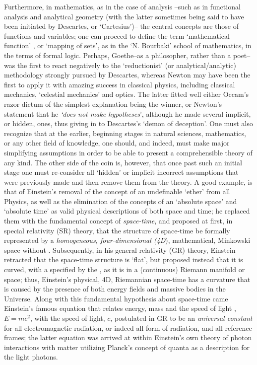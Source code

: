 \documentclass[12pt]{article}
\theoremstyle{plain}
\theoremstyle{definition}
\numberwithin{equation}{section}
\begin{document}
Furthermore, in mathematics, as in the case of analysis --such as in functional analysis and analytical geometry (with the latter sometimes being said to have been initiated by Descartes, or `Cartesius')-- the central concepts are those of functions and variables; one can proceed to define the term `mathematical function' , or `mapping of sets', as in the `N. Bourbaki' school of mathematics, in the terms of formal logic.
Perhaps, Goethe--as a philosopher, rather than a poet-- was the first to react negatively to the `reductionist' (or analytical/analytic) methodology strongly pursued by Descartes, whereas Newton may have been the first to apply it with amazing success in classical physics, including classical mechanics, `celestial mechanics' and optics. The latter fitted well either Occam's razor dictum of the simplest explanation being the winner, or Newton's statement that he \emph{`does not make hypotheses}', although he made several implicit, or hidden, ones, thus giving in to Descartes's `demon of deception'. One must also recognize that at the earlier, beginning stages in natural sciences, mathematics, or any other field of knowledge, one should, and indeed, must make major simplifying assumptions in order to be able to present a comprehensible theory of any kind. The other side of the coin is, however, that once past such an initial stage one must re-consider all `hidden' or implicit incorrect assumptions that were previously made and then remove them from the theory. A good example, is that of Einstein's removal of the concept of an undefinable `ether' from all Physics, as well as the elimination of the concepts of an `absolute space' and `absolute time' as valid physical descriptions of both space and time; he replaced them with the fundamental concept of \emph{space-time}, and proposed at first, in special relativity (SR) theory, that the structure of space-time be formally represented by a \emph{homogeneous, four-dimensional (4D}), mathematical, Minkowski space without
. Subsequently, in his general relativity (GR) theory, Einstein retracted that the space-time structure is `flat', but proposed instead that it is curved, with a
 specified by the , as it is in a (continuous) Riemann manifold or space; thus, Einstein's physical, 4D, Riemannian space-time has a curvature that is caused by the presence of both energy fields and massive bodies in the Universe. Along with this fundamental hypothesis about space-time came Einstein's famous equation that relates energy, mass and the speed of light , $E= mc^2$, with the speed of light, $c$, postulated in GR to be an \emph{universal constant} for all electromagnetic radiation, or indeed all form of radiation, and all reference frames; the latter equation was arrived at within Einstein's own theory of photon interactions with matter utilizing Planck's concept of quanta as a description for the light photons.
\end{document}
